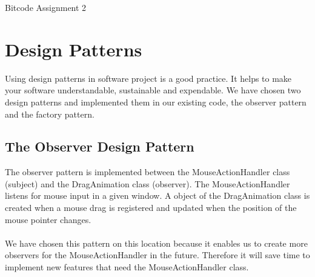 \documentclass{article}
\begin{document}

\begin{titlepage}
	\Huge{Bitcode Assignment 2}
\end{titlepage}


\section{Design Patterns}
Using design patterns in software project is a good practice. It helps to make your software understandable, sustainable and expendable. We have chosen two design patterns and implemented them in our existing code, the observer pattern and the factory pattern.

\subsection{The Observer Design Pattern}
The observer pattern is implemented between the MouseActionHandler class (subject) and the DragAnimation class (observer). The MouseActionHandler listens for mouse input in a given window. A object of the DragAnimation class is created when a mouse drag is registered and updated when the position of the mouse pointer changes. 
\paragraph{} We have chosen this pattern on this location because it enables us to create more observers for the MouseActionHandler in the future. Therefore it will save time to implement new features that need the MouseActionHandler class.
 
\end{document}

